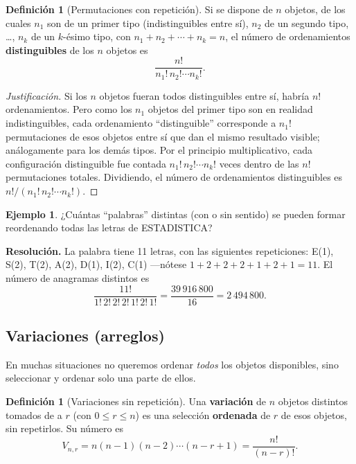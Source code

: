 \documentclass[11pt,a4paper]{article}
\theoremstyle{plain}
\theoremstyle{definition}
\newtheorem{definicion}[teorema]{Definición}
\newtheorem{ejemplo}[teorema]{Ejemplo}
\theoremstyle{remark}
\begin{document}
\begin{definicion}[Permutaciones con repetición]
Si se dispone de $n$ objetos, de los cuales $n_1$ son de un primer tipo (indistinguibles entre sí), $n_2$ de un segundo tipo, \dots, $n_k$ de un $k$-ésimo tipo, con $n_1+n_2+\cdots+n_k=n$, el número de ordenamientos \textbf{distinguibles} de los $n$ objetos es
\[
\frac{n!}{n_1!\,n_2! \cdots n_k!}.
\]
\end{definicion}

\begin{proof}[Justificación]
Si los $n$ objetos fueran todos distinguibles entre sí, habría $n!$ ordenamientos. Pero como los $n_1$ objetos del primer tipo son en realidad indistinguibles, cada ordenamiento ``distinguible'' corresponde a $n_1!$ permutaciones de esos objetos entre sí que dan el mismo resultado visible; análogamente para los demás tipos. Por el principio multiplicativo, cada configuración distinguible fue contada $n_1!\,n_2!\cdots n_k!$ veces dentro de las $n!$ permutaciones totales. Dividiendo, el número de ordenamientos distinguibles es $n!/(n_1!\,n_2!\cdots n_k!)$.
\end{proof}

\begin{ejemplo}
¿Cuántas ``palabras'' distintas (con o sin sentido) se pueden formar reordenando todas las letras de \textsc{ESTADISTICA}?
\end{ejemplo}

\textbf{Resolución.} La palabra tiene 11 letras, con las siguientes repeticiones: E(1), S(2), T(2), A(2), D(1), I(2), C(1) —nótese $1+2+2+2+1+2+1=11$. El número de anagramas distintos es
\[
\frac{11!}{1!\,2!\,2!\,2!\,1!\,2!\,1!} = \frac{39\,916\,800}{16} = 2\,494\,800.
\]

\subsection{Variaciones (arreglos)}

En muchas situaciones no queremos ordenar \emph{todos} los objetos disponibles, sino seleccionar y ordenar solo una parte de ellos.

\begin{definicion}[Variaciones sin repetición]
Una \textbf{variación} de $n$ objetos distintos tomados de a $r$ (con $0\leq r\leq n$) es una selección \textbf{ordenada} de $r$ de esos objetos, sin repetirlos. Su número es
\[
V_{n,r} = n(n-1)(n-2)\cdots(n-r+1) = \frac{n!}{(n-r)!}.
\]
\end{definicion}
\end{document}
